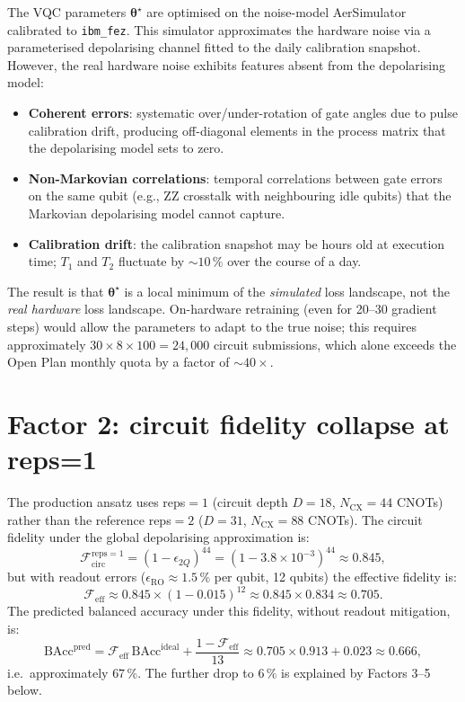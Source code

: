 \documentclass[11pt,a4paper, english]{book}
\theoremstyle{plain}
\theoremstyle{definition}
\numberwithin{equation}{chapter}
\numberwithin{figure}{chapter}
\numberwithin{table}{chapter}
\begin{document}
The VQC parameters $\boldsymbol{\theta}^\star$ are optimised on the 
noise-model AerSimulator calibrated to \texttt{ibm\_fez}.  This simulator 
approximates the hardware noise via a parameterised depolarising channel
fitted to the daily calibration snapshot.  However, the real hardware 
noise exhibits features absent from the depolarising model:
\begin{itemize}
  \item \textbf{Coherent errors}: systematic over/under-rotation of gate
        angles due to pulse calibration drift, producing off-diagonal 
        elements in the process matrix that the depolarising model sets to zero.
  \item \textbf{Non-Markovian correlations}: temporal correlations between 
        gate errors on the same qubit (e.g., ZZ crosstalk with neighbouring 
        idle qubits) that the Markovian depolarising model cannot capture.
  \item \textbf{Calibration drift}: the calibration snapshot may be hours 
        old at execution time; $T_1$ and $T_2$ fluctuate by ${\sim}10\,\%$ 
        over the course of a day.
\end{itemize}

The result is that $\boldsymbol{\theta}^\star$ is a local minimum of the 
\emph{simulated} loss landscape, not the \emph{real hardware} loss landscape.  
On-hardware retraining (even for 20--30 gradient steps) would allow the 
parameters to adapt to the true noise; this requires approximately 
$30 \times 8 \times 100 = 24{,}000$ circuit submissions, which alone 
exceeds the Open Plan monthly quota by a factor of ${\sim}40\times$.

\section{Factor 2: circuit fidelity collapse at reps=1}
\label{app:gap-fidelity}

The production ansatz uses reps$=1$ (circuit depth $D=18$, 
$N_\mathrm{CX}=44$ CNOTs) rather than the reference reps$=2$ 
($D=31$, $N_\mathrm{CX}=88$ CNOTs).  The circuit fidelity under 
the global depolarising approximation is:
\begin{equation}
  \mathcal{F}_\mathrm{circ}^\mathrm{reps=1} 
  = (1 - \epsilon_{2Q})^{44} 
  = (1 - 3.8\times10^{-3})^{44} \approx 0.845,
\end{equation}
but with readout errors ($\epsilon_\mathrm{RO}\approx1.5\,\%$ per qubit, 
12 qubits) the effective fidelity is:
\begin{equation}
  \mathcal{F}_\mathrm{eff} 
  \approx 0.845 \times (1-0.015)^{12} \approx 0.845 \times 0.834 \approx 0.705.
\end{equation}
The predicted balanced accuracy under this fidelity, without readout 
mitigation, is:
\begin{equation}
  \text{BAcc}^\mathrm{pred} 
  = \mathcal{F}_\mathrm{eff}\,\text{BAcc}^\mathrm{ideal} + \frac{1-\mathcal{F}_\mathrm{eff}}{13}
  \approx 0.705 \times 0.913 + 0.023 \approx 0.666,
\end{equation}
i.e.\ approximately $67\,\%$.  The further drop to $6\,\%$ is explained 
by Factors 3--5 below.
\end{document}
